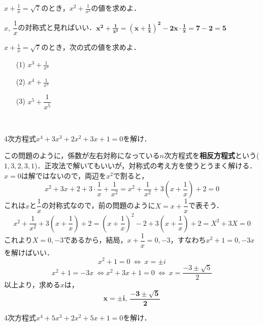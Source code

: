\documentclass[a4paper,11pt]{ltjsarticle}
\begin{document}
\begin{exque}
$\displaystyle{x+\frac{1}{x}=\sqrt7}$のとき，$\displaystyle{x^2+\frac{1}{x^2}}$の値を求めよ．
\end{exque}
\ans 
$x,~\dfrac1x$の対称式と見ればいい．$\boldsymbol{\displaystyle{x^2+\frac1{x^2}=\left(x+\frac1x\right)^2-2x\cdot\frac1x}=7-2=5}$
\begin{toi}
$\displaystyle{x+\frac{1}{x}=\sqrt7}$のとき，次の式の値を求めよ．\\[5pt]
\begin{minipage}{0.33\linewidth}
\begin{itemize}
    \item [(1)]$\displaystyle{x^3+\frac{1}{x^3}}$
\end{itemize}
\end{minipage}
\begin{minipage}{0.33\linewidth}
\begin{itemize}
    \item [(2)]$\displaystyle{x^4+\frac{1}{x^4}}$
\end{itemize}
\end{minipage}
\begin{minipage}{0.33\linewidth}
\begin{itemize}
    \item [(3)]$x^5+\dfrac{1}{x^5}$
\end{itemize}
\end{minipage}
\end{toi}
　
\begin{exque}
    4次方程式$x^4+3x^3+2x^2+3x+1=0$を解け．
\end{exque}
\noindent 
この問題のように，係数が左右対称になっている$n$次方程式を\textbf{相反方程式}という($1,3,2,3,1$)．正攻法で解いてもいいが，対称式の考え方を使うとうまく解ける．
\ans 
\noindent $x=0$は解ではないので，両辺を$x^2$で割ると，
\[x^2+3x+2+3\cdot\frac1x+\frac{1}{x^2}=x^2+\frac{1}{x^2}+3\left(x+\frac1x\right)+2=0\]
これは$x$と$\dfrac1x$の対称式なので，前の問題のように$X=x+\dfrac1x$で表そう．
\[x^2+\frac{1}{x^2}+3\left(x+\frac1x\right)+2=\left(x+\dfrac1x\right)^2-2+3\left(x+\dfrac1x\right)+2=X^2+3X=0\]
これより$X=0,-3$であるから，結局，$x+\dfrac1x=0,-3$，すなわち$x^2+1=0,-3x$を解けばいい．
\[x^2+1=0~\Longleftrightarrow~x=\pm i\]
\[x^2+1=-3x~\Longleftrightarrow x^2+3x+1=0~\Longleftrightarrow~x=\frac{-3\pm\sqrt5}{2}\]
以上より，求める$x$は，
\[\boldsymbol{x=\pm i ,~\frac{-3\pm\sqrt5}{2}}\]
\begin{toi}
    4次方程式$x^4+5x^3+2x^2+5x+1=0$を解け．
\end{toi}
\end{document}
